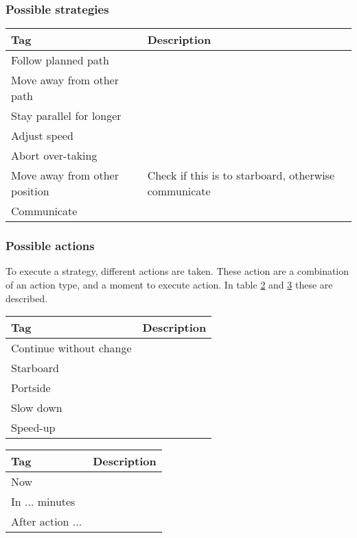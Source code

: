 \subsubsection{Possible strategies}
\begin{table}[H]
	\begin{tabular}{p{}|p{}}
		\toprule
		Tag & Description\\
		\midrule
		Follow planned path & \\
		Move away from other path & \\
		Stay parallel for longer & \\
		Adjust speed & \\
		Abort over-taking & \\
		Move away from other position & Check if this is to starboard, otherwise communicate \\
		Communicate & \\
		\bottomrule
	\end{tabular}
	
	\label{tab:strategies}
\end{table}

\subsubsection{Possible actions}
To execute a strategy, different actions are taken. These action are a combination of an action type, and a moment to execute action. In table \ref{tab:actions} and \ref{tab:time-domain-action} these are described.
\begin{table}[H]
	\begin{tabular}{p{}|p{}}
		\toprule
		Tag & Description\\
		\midrule
		Continue without change & \\
		Starboard & \\
		Portside & \\
		Slow down & \\
		Speed-up & \\
		\bottomrule
	\end{tabular}
	
	\label{tab:actions}
\end{table}

\begin{table}[H]
	\begin{tabular}{p{}|p{}}
		\toprule
		Tag & Description\\
		\midrule
		Now & \\
		In ... minutes & \\
		After action ... & \\
		\bottomrule
	\end{tabular}
	
	\label{tab:time-domain-action}
\end{table}


